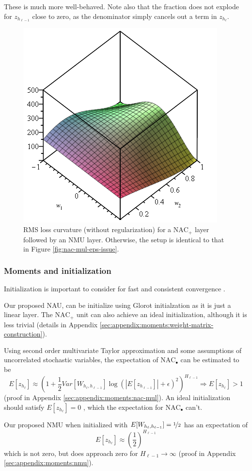 These is much more well-behaved. Note also that the fraction does not explode for $z_{h_{\ell-1}}$ close to zero, as the denominator simply cancels out a term in $z_{h_\ell}$.

\begin{figure}[H]
\centering
\includegraphics[width=0.33\linewidth]{graphics/nac-mul-nmu.png}
\caption{RMS loss curvature (without regularization) for a $\mathrm{NAC}_{+}$ layer followed by an $\mathrm{NMU}$ layer. Otherwise, the setup is identical to that in Figure \ref{fig:nac-mul-eps-issue}.}
\end{figure}

\subsubsection{Moments and initialization}

Initialization is important to consider for fast and consistent convergence \cite{glorot-initialization}.

Our proposed NAU, can be initialize using Glorot initialzation as it is just a linear layer. The $\mathrm{NAC}_{+}$ unit can also achieve an ideal initialization, although it is less trivial (details in Appendix \ref{sec:appendix:moments:weight-matrix-construction}).

Using second order multivariate Taylor approximation and some assumptions of uncorrelated stochastic variables, the expectation of $\mathrm{NAC}_{\bullet}$ can be estimated to be
\begin{equation}
E[z_{h_\ell}] \approx \left(1 + \frac{1}{2} Var[W_{h_\ell, h_{\ell-1}}] \log(|E[z_{h_{\ell-1}}]| + \epsilon)^2\right)^{H_{\ell-1}} \Rightarrow E[z_{h_\ell}] > 1 \label{eq:nac-mul:expectation}
\end{equation}
(proof in Appendix \ref{sec:appendix:moments:nac-mul}). An ideal initialization should satisfy $E[z_{h_\ell}] = 0$ \cite{glorot-initialization}, which the expectation for $\mathrm{NAC}_{\bullet}$ can't.

Our proposed NMU when initialized with $E[W_{h_{\ell}, h_{\ell - 1}}] = \nicefrac{1}{2}$ has an expectation of
\begin{equation}
E[z_{h_\ell}] \approx \left(\frac{1}{2}\right)^{H_{\ell-1}}
\end{equation}
which is not zero, but does approach zero for $H_{\ell-1} \rightarrow \infty$ (proof in Appendix \ref{sec:appendix:moments:nmu}).


